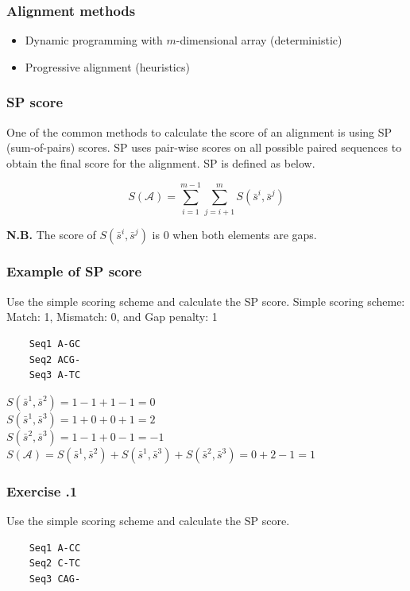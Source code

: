%
%
\subsubsection*{Alignment methods} 

\begin{itemize}
\item Dynamic programming with $m$-dimensional array (deterministic)
\item Progressive alignment (heuristics)
\end{itemize}

%
%
\subsubsection*{SP score} 
One of the common methods to calculate the score of an alignment is using SP (sum-of-pairs) scores. SP uses pair-wise scores on all possible paired sequences to obtain the final score for the alignment. SP is defined as below.

\[
S(\mathcal{A}) = \sum_{i=1}^{m-1} \sum_{j=i+1}^{m} S(\bar{s}^i, \bar{s}^j)
\]

\textbf{N.B.} The score of $S(\bar{s}^i, \bar{s}^j)$ is 0 when both elements are gaps.

%
%
\subsubsection*{Example of SP score} 
Use the simple scoring scheme and calculate the SP score. Simple scoring scheme: Match: 1, Mismatch: 0, and Gap penalty: 1

\begin{verbatim}
    Seq1 A-GC
    Seq2 ACG-
    Seq3 A-TC
\end{verbatim}

\noindent
$S(\bar{s}^1, \bar{s}^2)=1-1+1-1=0$ \\
$S(\bar{s}^1, \bar{s}^3)=1+0+0+1=2$ \\
$S(\bar{s}^2, \bar{s}^3)=1-1+0-1=-1$ \\

\noindent
$S(\mathcal{A}) =S(\bar{s}^1, \bar{s}^2) + S(\bar{s}^1, \bar{s}^3) + S(\bar{s}^2, \bar{s}^3) = 0 + 2 - 1 = 1$

%
%
\subsubsection*{Exercise \thesection.1}
Use the simple scoring scheme and calculate the SP score.

\begin{verbatim}
    Seq1 A-CC
    Seq2 C-TC
    Seq3 CAG-
\end{verbatim}

\bigskip 

%
